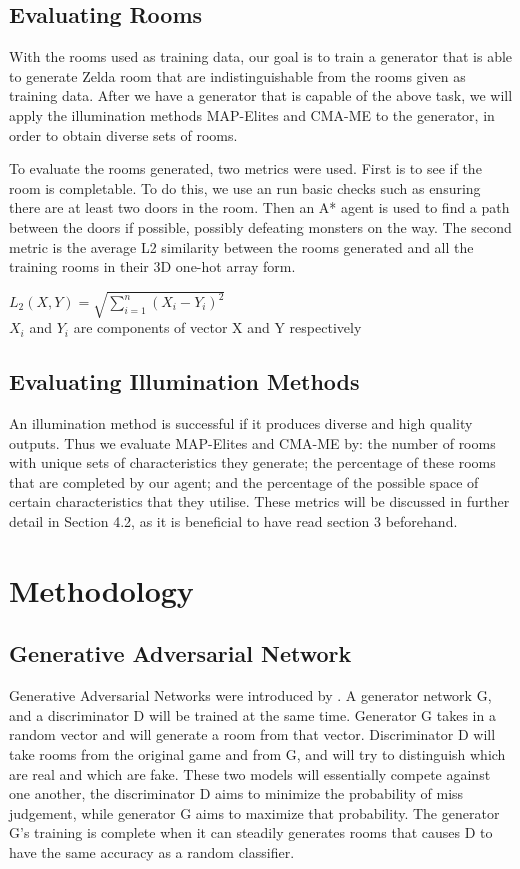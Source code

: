 \documentclass{article}
\begin{document}
\subsection{Evaluating Rooms}
With the rooms used as training data, our goal is to train a generator that is able to generate Zelda room that are indistinguishable from the rooms given as training data. After we have a generator that is capable of the above task, we will apply the illumination methods MAP-Elites and CMA-ME to the generator, in order to obtain diverse sets of rooms.

To evaluate the rooms generated, two metrics were used. First is to see if the room is completable.  To do this, we use an run basic checks such as ensuring there are at least two doors in the room. Then an A* agent is used to find a path between the doors if possible, possibly defeating monsters on the way. The second metric is the average L2 similarity between the rooms generated and all the training rooms in their 3D one-hot array form. 
\begin{center}
\Large
$L_2(X, Y) = \sqrt{\sum\limits_{i=1}^{n} (X_i - Y_i)^2}$\\\vspace{3mm}
\footnotesize
$X_i$ and $Y_i$ are components of vector X and Y respectively 
\end{center}

\subsection{Evaluating Illumination Methods}
An illumination method is successful if it produces diverse and high quality outputs. Thus we evaluate MAP-Elites and CMA-ME by: the number of rooms with unique sets of characteristics they generate; the percentage of these rooms that are completed by our agent; and the percentage of the possible space of certain characteristics that they utilise. These metrics will be discussed in further detail in Section 4.2, as it is beneficial to have read section 3 beforehand.


\section{Methodology}
\subsection{Generative Adversarial Network}
Generative Adversarial Networks were introduced by \cite{Goodfellow2014}. A generator network G, and a discriminator D will be trained at the same time. Generator G takes in a random vector and will generate a room from that vector. Discriminator D will take rooms from the original game and from G, and will try to distinguish which are real and which are fake. These two models will essentially compete against one another, the discriminator D aims to minimize the probability of miss judgement, while generator G aims to maximize that probability. The generator G's training is complete when it can steadily generates rooms that causes D to have the same accuracy as a random classifier.
\end{document}
